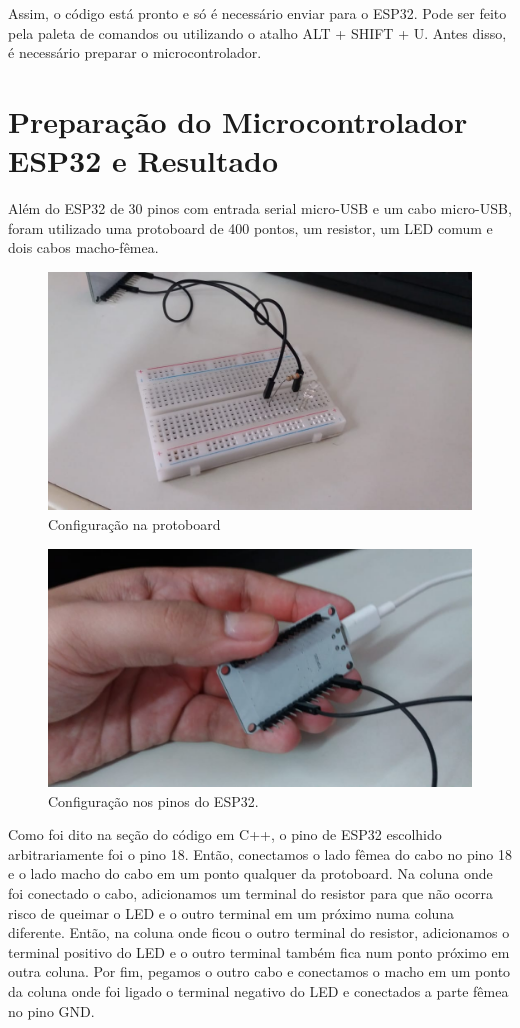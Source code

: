 \documentclass[12pt]{article}
\begin{document}
Assim, o código está pronto e só é necessário enviar para o ESP32. Pode ser feito pela paleta de comandos ou utilizando o atalho ALT + SHIFT + U. Antes disso, é necessário preparar o microcontrolador.

\section{Preparação do Microcontrolador ESP32 e Resultado}

Além do ESP32 de 30 pinos com entrada serial micro-USB e um cabo micro-USB, foram utilizado uma protoboard de 400 pontos, um resistor, um LED comum e dois cabos macho-fêmea.

\begin{figure}[H]
    \centering
    \includegraphics[width=0.5\linewidth]{img/Imagem do WhatsApp de 2024-10-25 à(s) 22.05.44_680386d1.jpg}
    \caption{Configuração na protoboard}
    \label{fig:protoboard}
\end{figure}

\begin{figure}[H]
    \centering
    \includegraphics[width=0.5\linewidth]{img/Imagem do WhatsApp de 2024-10-25 à(s) 22.05.44_a72b281d.jpg}
    \caption{Configuração nos pinos do ESP32.}
    \label{fig:esp32-pins}
\end{figure}

Como foi dito na seção do código em C++, o pino de ESP32 escolhido arbitrariamente foi o pino 18. Então, conectamos o lado fêmea do cabo no pino 18 e o lado macho do cabo em um ponto qualquer da protoboard. Na coluna onde foi conectado o cabo, adicionamos um terminal do resistor para que não ocorra risco de queimar o LED e o outro terminal em um próximo numa coluna diferente. Então, na coluna onde ficou o outro terminal do resistor, adicionamos o terminal positivo do LED e o outro terminal também fica num ponto próximo em outra coluna. Por fim, pegamos o outro cabo e conectamos o macho em um ponto da coluna onde foi ligado o terminal negativo do LED e conectados a parte fêmea no pino GND.
\end{document}
